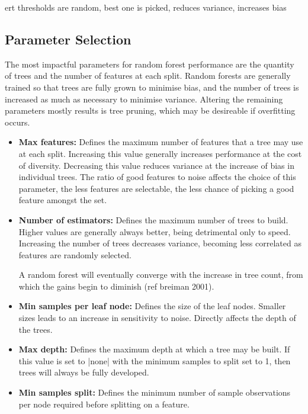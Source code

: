 ert thresholds are random, best one is picked, reduces variance, increases bias

\subsection{Parameter Selection}
The most impactful parameters for random forest performance are the quantity of
trees and the number of features at each split.
Random forests are generally trained so that trees are fully grown to minimise
bias, and the number of trees is increased as much as necessary to minimise variance.
Altering the remaining parameters mostly results is tree pruning, which may be
desireable if overfitting occurs.

\begin{itemize}
  \item \textbf{Max features:}
    Defines the maximum number of features that a tree may use at each split.
    Increasing this value generally increases performance at the cost of
    diversity.
    Decreasing this value reduces variance at the increase of bias in individual
    trees.
    The ratio of good features to noise affects the choice of this parameter,
    the less features are selectable, the less chance of picking a good feature
    amongst the set.

  \item \textbf{Number of estimators:}
    Defines the maximum number of trees to build.
    Higher values are generally always better, being detrimental only to speed.
    Increasing the number of trees decreases variance, becoming less
    correlated as features are randomly selected.

    A random forest will eventually converge with the increase in tree count,
    from which the gains begin to diminish (ref breiman 2001).

  \item \textbf{Min samples per leaf node:}
    Defines the size of the leaf nodes.
    Smaller sizes leads to an increase in sensitivity to noise.
    Directly affects the depth of the trees.

  \item \textbf{Max depth:}
    Defines the maximum depth at which a tree may be built.
    If this value is set to |none| with the minimum samples to split set to 1,
    then trees will always be fully developed.

  \item \textbf{Min samples split:}
    Defines the minimum number of sample observations per node required before
    splitting on a feature.
\end{itemize}

